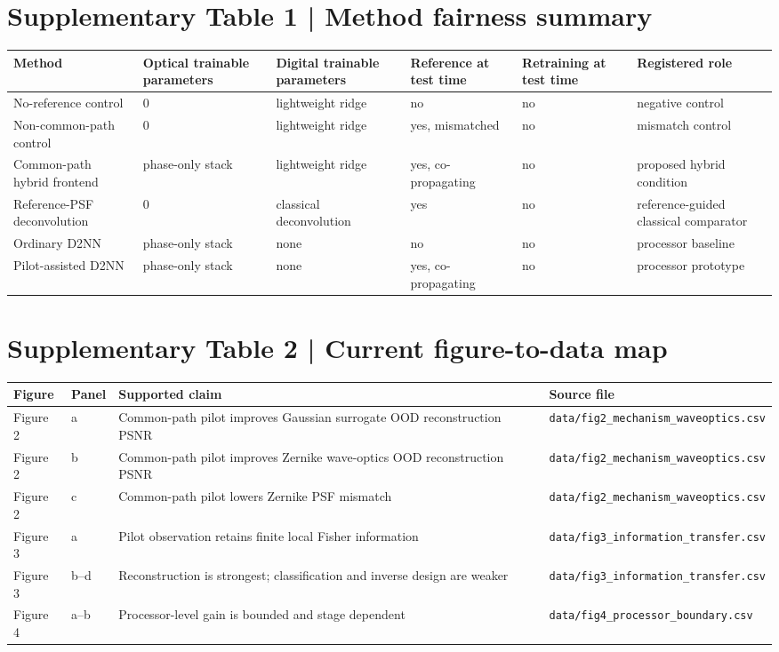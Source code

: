 \documentclass[11pt]{article}
\begin{document}
\section*{Supplementary Table 1 | Method fairness summary}
\begin{longtable}{p{3.0cm}p{2.2cm}p{2.2cm}p{1.7cm}p{2.2cm}p{2.4cm}}
\toprule
Method & Optical trainable parameters & Digital trainable parameters & Reference at test time & Retraining at test time & Registered role \\
\midrule
No-reference control & 0 & lightweight ridge & no & no & negative control \\
Non-common-path control & 0 & lightweight ridge & yes, mismatched & no & mismatch control \\
Common-path hybrid frontend & phase-only stack & lightweight ridge & yes, co-propagating & no & proposed hybrid condition \\
Reference-PSF deconvolution & 0 & classical deconvolution & yes & no & reference-guided classical comparator \\
Ordinary D2NN & phase-only stack & none & no & no & processor baseline \\
Pilot-assisted D2NN & phase-only stack & none & yes, co-propagating & no & processor prototype \\
\bottomrule
\end{longtable}

\section*{Supplementary Table 2 | Current figure-to-data map}
\begin{longtable}{p{1.8cm}p{2.1cm}p{6.2cm}p{3.0cm}}
\toprule
Figure & Panel & Supported claim & Source file \\
\midrule
Figure 2 & a & Common-path pilot improves Gaussian surrogate OOD reconstruction PSNR & \texttt{data/fig2\_mechanism\_waveoptics.csv} \\
Figure 2 & b & Common-path pilot improves Zernike wave-optics OOD reconstruction PSNR & \texttt{data/fig2\_mechanism\_waveoptics.csv} \\
Figure 2 & c & Common-path pilot lowers Zernike PSF mismatch & \texttt{data/fig2\_mechanism\_waveoptics.csv} \\
Figure 3 & a & Pilot observation retains finite local Fisher information & \texttt{data/fig3\_information\_transfer.csv} \\
Figure 3 & b--d & Reconstruction is strongest; classification and inverse design are weaker & \texttt{data/fig3\_information\_transfer.csv} \\
Figure 4 & a--b & Processor-level gain is bounded and stage dependent & \texttt{data/fig4\_processor\_boundary.csv} \\
\bottomrule
\end{longtable}
\end{document}
